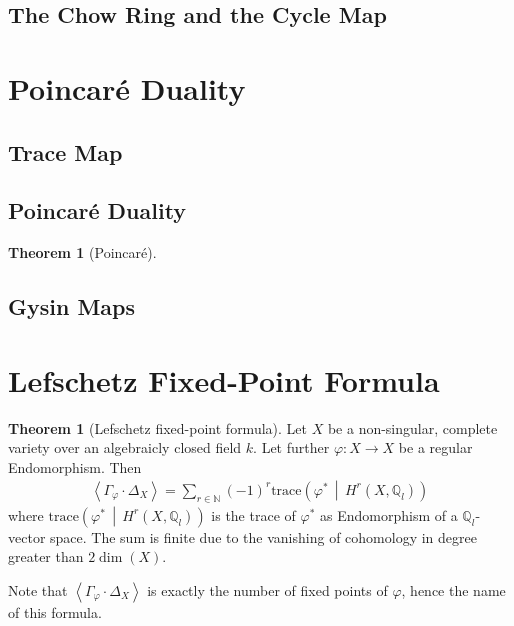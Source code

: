 \documentclass[english]{scrartcl}
\theoremstyle{definition}
\newtheorem{Thm}[Def]{Theorem}
\theoremstyle{remark}
\newcommand*{\N}{\mathds{N}}
\newcommand*{\Z}{\mathds{Z}}
\newcommand*{\Q}{\mathds{Q}}
\newcommand*{\Zl}{\Z_l} %
\newcommand*{\Ql}{\Q_l} %
\newcommand*{\intProd}[2]{{#1\cdot#2}} %
\newcommand*{\intNum}[1]{{\left\langle{#1}\right\rangle}} %
\newcommand*{\Graph}[1]{{\Gamma_{#1}}} %
\newcommand*{\Diag}[1]{{\Delta_{#1}}} %
\newcommand*{\trace}[2]{{\text{trace}\left(#1 \,\middle|\, #2 \right)}} %
\renewcommand*{\phi}{\varphi}
\begin{document}
\subsection{The Chow Ring and the Cycle Map}

\section{Poincaré Duality}
\subsection{Trace Map}
\subsection{Poincaré Duality}
\begin{Thm}[Poincaré]
  
\end{Thm}
\subsection{Gysin Maps}

\section{Lefschetz Fixed-Point Formula}

\begin{Thm}[Lefschetz fixed-point formula]\label{lefschetzthm}
  Let $X$ be a non-singular, complete variety over an algebraicly
  closed field $k$.
  Let further $\phi\colon X\to X$ be a regular Endomorphism.
  Then
  \begin{gather*}
    \intNum{\intProd{\Graph{\phi}}{\Diag{X}}}
    = \sum_{r\in\N} (-1)^r \trace{\phi^*}{H^r(X,\Ql)}
  \end{gather*}
  where $\trace{\phi^*}{H^r(X,\Ql)}$ is the trace of $\phi^*$ as
  Endomorphism of a $\Ql$-vector space. 
  The sum is finite due to the vanishing
  of cohomology in degree greater than $2\dim(X)$. 
\end{Thm}
Note that $\intNum{\intProd{\Graph{\phi}}{\Diag{X}}}$ is exactly the number of
fixed points of $\phi$, hence the name of this formula.
\end{document}
